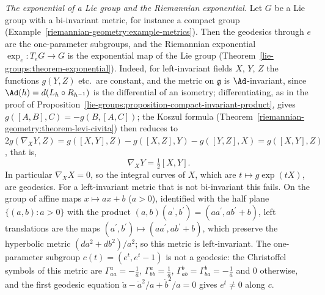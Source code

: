 \begin{example}\label{riemannian-geometry:example-lie-exponential}
\emph{The exponential of a Lie group and the Riemannian exponential.} Let $G$ be a Lie group with a bi-invariant metric, for instance a compact group
(Example~\ref{riemannian-geometry:example-metrics}). Then the geodesics through $e$ are the one-parameter subgroups, and the Riemannian exponential $\exp_e \colon T_eG \to G$ is the exponential map of the
Lie group (Theorem~\ref{lie-groups:theorem-exponential}). Indeed, for left-invariant fields $X$, $Y$, $Z$ the functions $g(Y, Z)$ etc.\ are constant, and the metric on $\mathfrak{g}$ is $\Ad$-invariant, since $\Ad(h) = d(L_h \circ R_{h^{-1}})$ is the differential of an isometry; differentiating, as in the proof of
Proposition~\ref{lie-groups:proposition-compact-invariant-product}, gives $g([A, B], C) = -g(B, [A, C])$; the Koszul formula (Theorem~\ref{riemannian-geometry:theorem-levi-civita}) then reduces to
$2g(\nabla_XY, Z) = g([X, Y], Z) - g([X, Z], Y) - g([Y, Z], X) = g([X, Y], Z)$, that is,
\[
\nabla_XY = \tfrac12[X, Y].
\]
In particular $\nabla_XX = 0$, so the integral curves of $X$, which are $t \mapsto g\exp(tX)$, are geodesics. For a left-invariant metric that is not bi-invariant this fails. On the group of affine maps
$x \mapsto ax + b$ ($a > 0$), identified with the half plane $\{(a, b) : a > 0\}$ with the product $(a, b)(a^{\prime}, b^{\prime}) = (aa^{\prime}, ab^{\prime} + b)$, left translations are the maps
$(a^{\prime}, b^{\prime}) \mapsto (aa^{\prime}, ab^{\prime} + b)$, which preserve the hyperbolic metric $(da^2 + db^2)/a^2$; so this metric is left-invariant. The one-parameter subgroup $c(t) = (e^t, e^t - 1)$ is
not a geodesic: the Christoffel symbols of this metric are $\Gamma^a_{aa} = -\frac1a$, $\Gamma^a_{bb} = \frac1a$, $\Gamma^b_{ab} = \Gamma^b_{ba} = -\frac1a$ and $0$ otherwise, and the first geodesic equation
$\ddot a - \dot a^2/a + \dot b^2/a = 0$ gives $e^t \neq 0$ along $c$.
\end{example}


